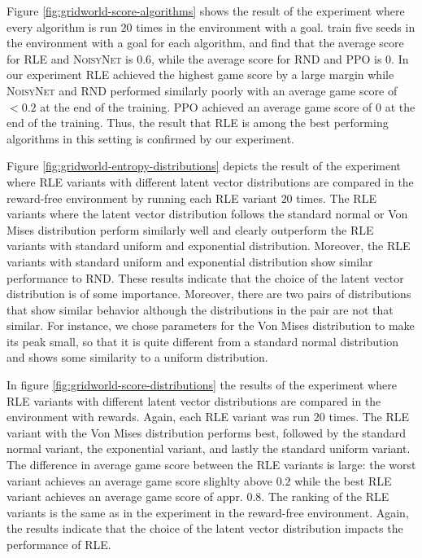\documentclass[10pt]{article} %
\begin{document}
Figure \ref{fig:gridworld-score-algorithms} shows the result of the experiment where every algorithm is run $20$ times in the environment with a goal. \cite{rle-paper} train five seeds in the environment with a goal for each algorithm, and find that the average score for \textsc{RLE} and \textsc{NoisyNet} is $0.6$, while the average score for \textsc{RND} and \textsc{PPO} is $0$. In our experiment \textsc{RLE} achieved the highest game score by a large margin while \textsc{NoisyNet} and \textsc{RND} performed similarly poorly with an average game score of $<0.2$ at the end of the training. \textsc{PPO} achieved an average game score of $0$ at the end of the training. Thus, the result that \textsc{RLE} is among the best performing algorithms in this setting is confirmed by our experiment.

Figure \ref{fig:gridworld-entropy-distributions} depicts the result of the experiment where \textsc{RLE} variants with different latent vector distributions are compared in the reward-free environment by running each \textsc{RLE} variant $20$ times. The \textsc{RLE} variants where the latent vector distribution follows the standard normal or Von Mises distribution perform similarly well and clearly outperform the \textsc{RLE} variants with standard uniform and exponential distribution. Moreover, the \textsc{RLE} variants with standard uniform and exponential distribution show similar performance to \textsc{RND}. These results indicate that the choice of the latent vector distribution is of some importance. Moreover, there are two pairs of distributions that show similar behavior although the distributions in the pair are not that similar. For instance, we chose parameters for the Von Mises distribution to make its peak small, so that it is quite different from a standard normal distribution and shows some similarity to a uniform distribution. 

In figure \ref{fig:gridworld-score-distributions} the results of the experiment where \textsc{RLE} variants with different latent vector distributions are compared in the environment with rewards. Again, each \textsc{RLE} variant was run $20$ times. The \textsc{RLE} variant with the Von Mises distribution performs best, followed by the standard normal variant, the exponential variant, and lastly the standard uniform variant. The difference in average game score between the \textsc{RLE} variants is large: the worst variant achieves an average game score slighlty above $0.2$ while the best \textsc{RLE} variant achieves an average game score of appr. $0.8$. The ranking of the \textsc{RLE} variants is the same as in the experiment in the reward-free environment. Again, the results indicate that the choice of the latent vector distribution impacts the performance of \textsc{RLE}.
\end{document}
